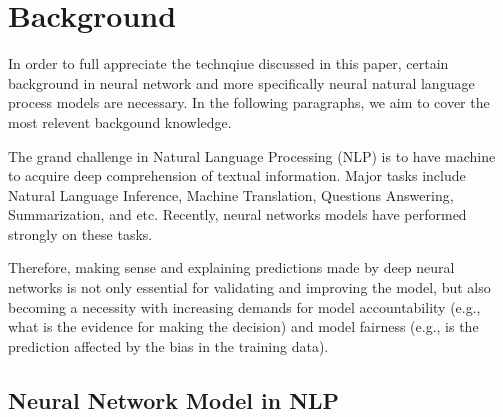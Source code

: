 \section{Background}
\label{sec:languageInference}

In order to full appreciate the technqiue discussed in this paper, certain background
in neural network and more specifically neural natural language process models are necessary.
In the following paragraphs, we aim to cover the most relevent backgound knowledge.


The grand challenge in Natural Language Processing (NLP) is to have machine to acquire
deep comprehension of textual information. Major tasks include Natural Language Inference,
Machine Translation, Questions Answering, Summarization, and etc.
Recently, neural networks models have performed strongly on these tasks.

Therefore, making sense and explaining predictions made by deep neural networks is not only
essential for validating and improving the model, but also becoming a necessity with
increasing demands for model accountability (e.g., what is the evidence for making the decision)
and model fairness (e.g., is the prediction affected by the bias in the training data).




\subsection{Neural Network Model in NLP}


